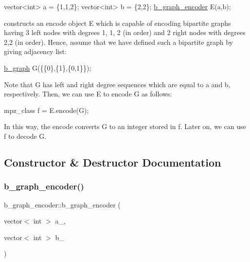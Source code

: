 \begin{DoxyCode}
vector<int> a = \{1,1,2\};
vector<int> b = \{2,2\};
\hyperlink{classb__graph__encoder}{b\_graph\_encoder} E(a,b);
\end{DoxyCode}


constructs an encode object E which is capable of encoding bipartite graphs having 3 left nodes with degrees 1, 1, 2 (in order) and 2 right nodes with degrees 2,2 (in order). Hence, assume that we have defined such a bipartite graph by giving adjacency list\+:


\begin{DoxyCode}
\hyperlink{classb__graph}{b\_graph} G(\{\{0\},\{1\},\{0,1\}\});
\end{DoxyCode}


Note that G has left and right degree sequences which are equal to a and b, respectively. Then, we can use E to encode G as follows\+:


\begin{DoxyCode}
mpz\_class f = E.encode(G);
\end{DoxyCode}


In this way, the encode converts G to an integer stored in f. Later on, we can use f to decode G. 

\subsection{Constructor \& Destructor Documentation}
\mbox{\label{classb__graph__encoder_a77b8fc4f060a8ef159583f1cfa35f283}} 
\subsubsection{\texorpdfstring{b\+\_\+graph\+\_\+encoder()}{b\_graph\_encoder()}}
{\footnotesize\ttfamily b\+\_\+graph\+\_\+encoder\+::b\+\_\+graph\+\_\+encoder (\begin{DoxyParamCaption}\item[{vector$<$ int $>$}]{a\+\_\+,  }\item[{vector$<$ int $>$}]{b\+\_\+ }\end{DoxyParamCaption})\hspace{0.3cm}{\ttfamily [inline]}}




